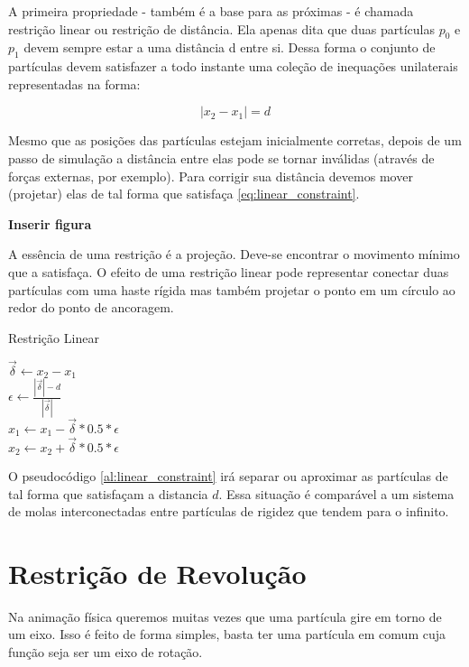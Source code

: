 A primeira propriedade - também é a base para as próximas - é chamada restrição linear ou restrição de distância. Ela apenas dita que duas partículas $p_0$ e $p_1$ devem sempre estar a uma distância d entre si. Dessa forma o conjunto de partículas devem satisfazer a todo instante uma coleção de inequações unilaterais representadas na forma:

\begin{equation}
	|x_2 - x_1| = d
	\label{eq:linear_constraint}
\end{equation}

Mesmo que as posições das partículas estejam inicialmente corretas, depois de um passo de simulação a distância entre elas pode se tornar inválidas (através de forças externas, por exemplo). Para corrigir sua distância devemos mover (projetar) elas de tal forma que satisfaça \ref{eq:linear_constraint}.

\textbf{Inserir figura}

A essência de uma restrição é a projeção. Deve-se encontrar o movimento mínimo que a satisfaça. O efeito de uma restrição linear pode representar conectar duas partículas com uma haste rígida mas também projetar o ponto em um círculo ao redor do ponto de ancoragem.

\begin{algorithm}[H]
	\caption{Restrição Linear}
	$\vec{\delta} \leftarrow x_2 - x_1$ \\
	$\epsilon \leftarrow \frac{|\vec{\delta}| - d}{|\vec{\delta}|}$ \\
	$x_1 \leftarrow x_1 - \vec{\delta}*0.5*\epsilon$ \\
	$x_2 \leftarrow x_2 + \vec{\delta}*0.5*\epsilon$ \\
	\label{al:linear_constraint}
\end{algorithm}

O pseudocódigo \ref{al:linear_constraint} irá separar ou aproximar as partículas de tal forma que satisfaçam a distancia $d$. Essa situação é comparável a um sistema de molas interconectadas entre partículas de rigidez que tendem para o infinito.

\section{Restrição de Revolução}

Na animação física queremos muitas vezes que uma partícula gire em torno de um eixo. Isso é feito de forma simples, basta ter uma partícula em comum cuja função seja ser um eixo de rotação.

